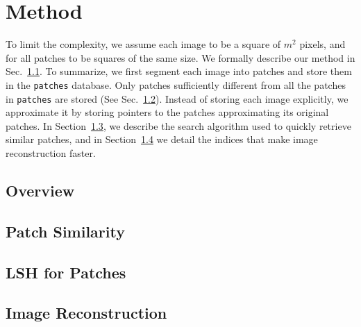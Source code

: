 \section{Method}\label{sec:method}

To limit the complexity, we assume
each image to be a square of $m^2$ pixels, and for all patches to
be squares of the same size.
We formally describe our method in Sec.~\ref{ssec:overview}. To summarize,
we first segment each image into patches and store them in the \texttt{patches} database.
Only patches sufficiently different
from all the patches in \texttt{patches} are stored (See Sec.~\ref{ssec:sim}).
Instead of storing each image explicitly, we approximate it by storing pointers to the patches
approximating its original patches. In Section~\ref{ssec:lsh}, we describe the
search algorithm used to quickly retrieve similar patches, and in Section~\ref{ssec:reconst}
we detail the indices that make image reconstruction faster.

\subsection{Overview}\label{ssec:overview}

\subsection{Patch Similarity}\label{ssec:sim}

\subsection{LSH for Patches}\label{ssec:lsh}

\subsection{Image Reconstruction}\label{ssec:reconst}
